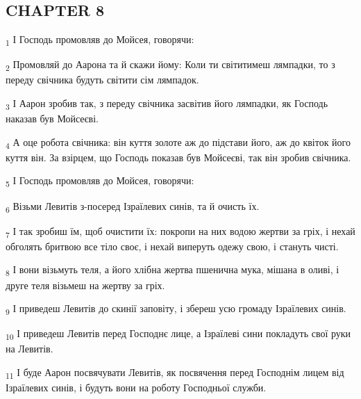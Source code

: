 \subsection{CHAPTER 8}
\begin{tcolorbox}
\textsubscript{1} І Господь промовляв до Мойсея, говорячи:
\end{tcolorbox}
\begin{tcolorbox}
\textsubscript{2} Промовляй до Аарона та й скажи йому: Коли ти світитимеш лямпадки, то з переду свічника будуть світити сім лямпадок.
\end{tcolorbox}
\begin{tcolorbox}
\textsubscript{3} І Аарон зробив так, з переду свічника засвітив його лямпадки, як Господь наказав був Мойсеєві.
\end{tcolorbox}
\begin{tcolorbox}
\textsubscript{4} А оце робота свічника: він куття золоте аж до підстави його, аж до квіток його куття він. За взірцем, що Господь показав був Мойсеєві, так він зробив свічника.
\end{tcolorbox}
\begin{tcolorbox}
\textsubscript{5} І Господь промовляв до Мойсея, говорячи:
\end{tcolorbox}
\begin{tcolorbox}
\textsubscript{6} Візьми Левитів з-посеред Ізраїлевих синів, та й очисть їх.
\end{tcolorbox}
\begin{tcolorbox}
\textsubscript{7} І так зробиш їм, щоб очистити їх: покропи на них водою жертви за гріх, і нехай обголять бритвою все тіло своє, і нехай виперуть одежу свою, і стануть чисті.
\end{tcolorbox}
\begin{tcolorbox}
\textsubscript{8} І вони візьмуть теля, а його хлібна жертва пшенична мука, мішана в оливі, і друге теля візьмеш на жертву за гріх.
\end{tcolorbox}
\begin{tcolorbox}
\textsubscript{9} І приведеш Левитів до скинії заповіту, і збереш усю громаду Ізраїлевих синів.
\end{tcolorbox}
\begin{tcolorbox}
\textsubscript{10} І приведеш Левитів перед Господнє лице, а Ізраїлеві сини покладуть свої руки на Левитів.
\end{tcolorbox}
\begin{tcolorbox}
\textsubscript{11} І буде Аарон посвячувати Левитів, як посвячення перед Господнім лицем від Ізраїлевих синів, і будуть вони на роботу Господньої служби.
\end{tcolorbox}
